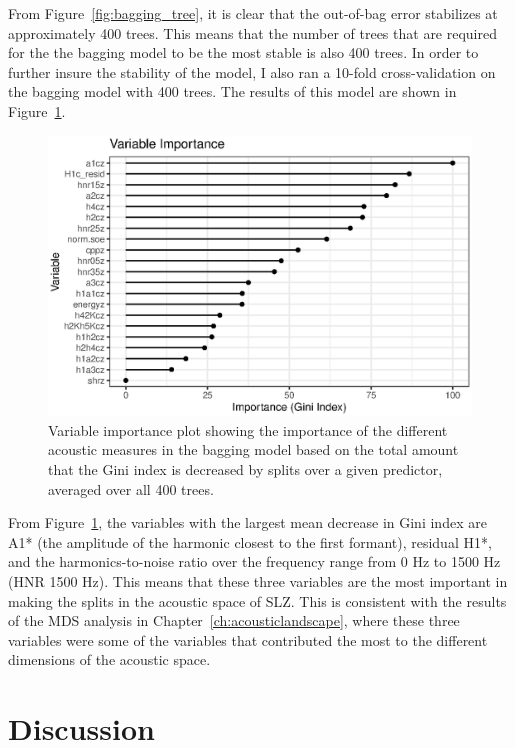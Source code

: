 From Figure~\ref{fig:bagging_tree}, it is clear that the out-of-bag error stabilizes at approximately 400 trees. This means that the number of trees that are required for the the bagging model to be the most stable is also 400 trees. In order to further insure the stability of the model, I also ran a 10-fold cross-validation on the bagging model with 400 trees. The results of this model are shown in Figure~\ref{fig:bagging_importance}.

\begin{figure}[!h]
    \centering
    \includegraphics[width = 0.9\linewidth]{images/vip_bagging.eps}
    \caption{Variable importance plot showing the importance of the different acoustic measures in the bagging model based on the total amount that the Gini index is decreased by splits over a given predictor, averaged over all 400 trees.}
    \label{fig:bagging_importance}
\end{figure}

From Figure~\ref{fig:bagging_importance}, the variables with the largest mean decrease in Gini index are A1* (the amplitude of the harmonic closest to the first formant), residual H1*, and the harmonics-to-noise ratio over the frequency range from 0 Hz to 1500 Hz (HNR 1500 Hz). This means that these three variables are the most important in making the splits in the acoustic space of SLZ. This is consistent with the results of the MDS analysis in Chapter~\ref{ch:acousticlandscape}, where these three variables were some of the variables that contributed the most to the different dimensions of the acoustic space. 

\section{Discussion} \label{sec:bagging_discussion}

